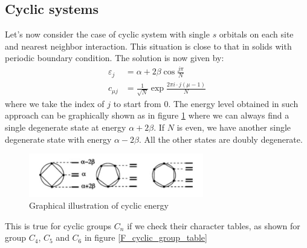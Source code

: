 \documentclass{article}
\begin{document}
\subsection{Cyclic systems}
Let's now consider the case of cyclic system with single $s$ orbitals on each site and nearest neighbor interaction. 
This situation is close to that in solids with periodic boundary condition. The solution is now given by:
\begin{align}
    \label{E:cyclic_system_energy}
    \varepsilon_j &= \alpha + 2 \beta \cos\frac{j\pi}{N} \\ 
    c_{\mu j} &= \frac{1}{\sqrt{N}} \exp \frac{2\pi i \cdot j (\mu-1)}{N} 
\end{align}
where we take the index of $j$ to start from 0. 
The energy level obtained in such approach can be graphically shown as in figure \ref{F:cyclic_energy} 
where we can always find a single degenerate state at energy $\alpha + 2 \beta$. If $N$ is even, we have 
another single degenerate state with energy $\alpha - 2 \beta$. All the other states are doubly degenerate. 
\begin{figure}[h!]
    \centering
    \includegraphics[width=3in]{figures/F_cyclic_energy.png}
    \caption{Graphical illustration of cyclic energy}
    \label{F:cyclic_energy}
\end{figure}
This is true for cyclic groups $C_n$ if we check their character tables, as shown for group $C_4$, $C_5$ and 
$C_6$ in figure \ref{F_cyclic_group_table}
\end{document}
